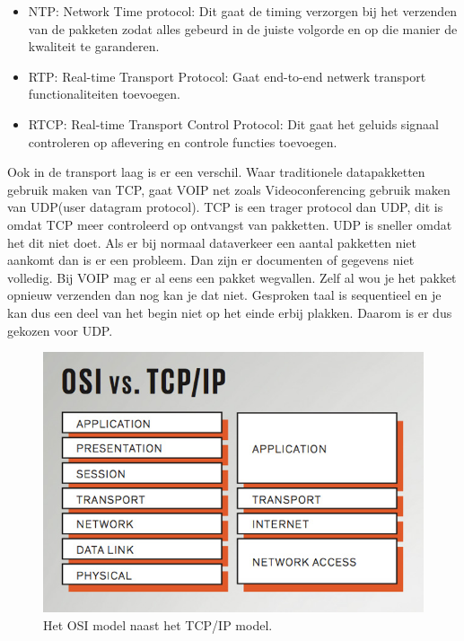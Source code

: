 \documentclass[pdftex,a4paper,12pt,twoside]{report}
\begin{document}
\begin{itemize}
	\item NTP: Network Time protocol: Dit gaat de timing verzorgen bij het verzenden van de pakketen zodat alles gebeurd in de juiste volgorde en op die manier de kwaliteit te garanderen.
	\item RTP: Real-time Transport Protocol: Gaat end-to-end netwerk transport functionaliteiten toevoegen.
	\item RTCP: Real-time Transport Control Protocol: Dit gaat het geluids signaal controleren op aflevering en controle functies toevoegen.
\end{itemize}

Ook in de transport laag is er een verschil. Waar traditionele datapakketten gebruik maken van TCP, gaat VOIP net zoals Videoconferencing gebruik maken van UDP(user datagram protocol). TCP is een trager protocol dan UDP, dit is omdat TCP meer controleerd op ontvangst van pakketten. UDP is sneller omdat het dit niet doet. 
Als er bij normaal dataverkeer een aantal pakketten niet aankomt dan is er een probleem. Dan zijn er documenten of gegevens niet volledig. Bij VOIP mag er al eens een pakket wegvallen. Zelf al wou je het pakket opnieuw verzenden dan nog kan je dat niet. Gesproken taal is sequentieel en je kan dus een deel van het begin niet op het einde erbij plakken.
Daarom is er dus gekozen voor UDP. 



\begin{figure}[h]
\caption{Het OSI model naast het TCP/IP model.\protect \footnotemark}
\includegraphics[scale=0.5]{img/TCP}
\end{figure}
\end{document}
